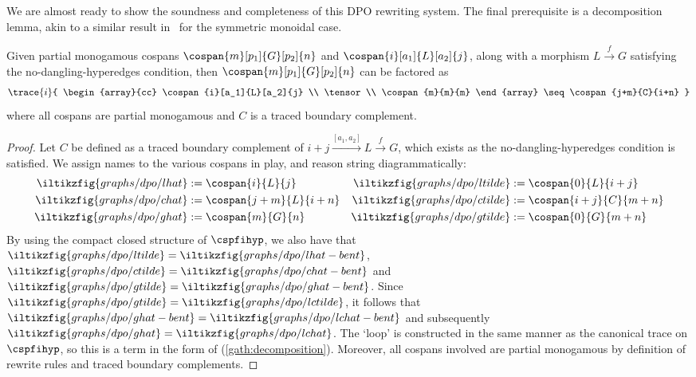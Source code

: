 \noindent
We are almost ready to show the soundness and completeness of this DPO rewriting system.
The final prerequisite is a decomposition lemma, akin to a similar result in~\cite{bonchi2021string} for the symmetric monoidal case.

\begin{lemma}\label{lem:decomposition}
    Given partial monogamous cospans \(\cospan{m}[p_1]{G}[p_2]{n}\) and \(\cospan{i}[a_1]{L}[a_2]{j}\), along with a morphism \(L \xrightarrow{f} G\) satisfying the no-dangling-hyperedges condition, then \(\cospan{m}[p_1]{G}[p_2]{n}\) can be factored as
    \begin{gather}
        \trace{i}{
            \begin{array}{cc}
                \cospan{i}[a_1]{L}[a_2]{j} \\
                \tensor \\
                \cospan{m}{m}{m}
            \end{array}
            \seq
            \cospan{j+m}{C}{i+n}
        }
        \label{gath:decomposition}
    \end{gather}
    where all cospans are partial monogamous and \(C\) is a traced boundary complement.
\end{lemma}
\begin{proof}
    Let \(C\) be defined as a traced boundary complement of \(i+j \xrightarrow{[a_1,a_2]} L \xrightarrow{f} G\), which exists as the no-dangling-hyperedges condition is satisfied.
    We assign names to the various cospans in play, and reason string diagrammatically:
    \begin{align*}
        \iltikzfig{graphs/dpo/lhat} &:= \cospan{i}{L}{j}
        &
        \iltikzfig{graphs/dpo/ltilde} &:= \cospan{0}{L}{i+j} \\
        \iltikzfig{graphs/dpo/chat} &:= \cospan{j+m}{L}{i+n}
        &
        \iltikzfig{graphs/dpo/ctilde} &:= \cospan{i+j}{C}{m+n} \\
        \iltikzfig{graphs/dpo/ghat} &:= \cospan{m}{G}{n}
        &
        \iltikzfig{graphs/dpo/gtilde} &:= \cospan{0}{G}{m+n}
    \end{align*}
    By using the compact closed structure of \(\cspfihyp\), we also have that \(
        \iltikzfig{graphs/dpo/ltilde} = \iltikzfig{graphs/dpo/lhat-bent}
    \), \(
        \iltikzfig{graphs/dpo/ctilde} = \iltikzfig{graphs/dpo/chat-bent}
    \) and \(
        \iltikzfig{graphs/dpo/gtilde} = \iltikzfig{graphs/dpo/ghat-bent}
    \).
    Since \(
        \iltikzfig{graphs/dpo/gtilde} = \iltikzfig{graphs/dpo/lctilde}
    \), it follows that \(
        \iltikzfig{graphs/dpo/ghat-bent} = \iltikzfig{graphs/dpo/lchat-bent}
    \) and subsequently \(
        \iltikzfig{graphs/dpo/ghat} = \iltikzfig{graphs/dpo/lchat}
    \).
    The `loop' is constructed in the same manner as the canonical trace on \(\cspfihyp\), so this is a term in the form of (\ref{gath:decomposition}).
    Moreover, all cospans involved are partial monogamous by definition of rewrite rules and traced boundary complements.
\end{proof}

